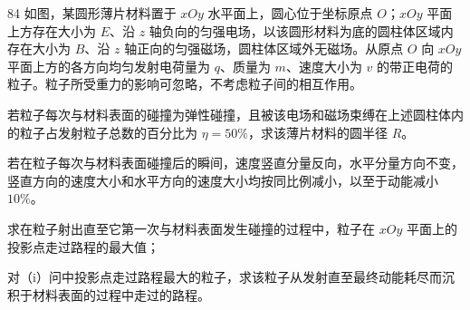 \begin{problem}[第34届物理决赛][电场磁场束缚粒子]{84}
    如图，某圆形薄片材料置于 $xOy$ 水平面上，圆心位于坐标原点 $O$；$xOy$ 平面上方存在大小为 $E$、沿 $z$ 轴负向的匀强电场，以该圆形材料为底的圆柱体区域内存在大小为 $B$、沿 $z$ 轴正向的匀强磁场，圆柱体区域外无磁场。从原点 $O$ 向 $xOy$ 平面上方的各方向均匀发射电荷量为 $q$、质量为 $m$、速度大小为 $v$ 的带正电荷的粒子。粒子所受重力的影响可忽略，不考虑粒子间的相互作用。
    \begin{subproblem}
        \begin{subsubproblem}
            若粒子每次与材料表面的碰撞为弹性碰撞，且被该电场和磁场束缚在上述圆柱体内的粒子占发射粒子总数的百分比为 $\eta = 50\%$，求该薄片材料的圆半径 $R$。
        \end{subsubproblem}
        \begin{subsubproblem}
            若在粒子每次与材料表面碰撞后的瞬间，速度竖直分量反向，水平分量方向不变，竖直方向的速度大小和水平方向的速度大小均按同比例减小，以至于动能减小 $10\%$。
            \begin{subsubsubproblem}
                \begin{subsubsubsubproblem}
                    求在粒子射出直至它第一次与材料表面发生碰撞的过程中，粒子在 $xOy$ 平面上的投影点走过路程的最大值；
                \end{subsubsubsubproblem}
                \begin{subsubsubsubproblem}
                    对（i）问中投影点走过路程最大的粒子，求该粒子从发射直至最终动能耗尽而沉积于材料表面的过程中走过的路程。
                \end{subsubsubsubproblem}
            \end{subsubsubproblem}
        \end{subsubproblem}
    \end{subproblem}
\end{problem}